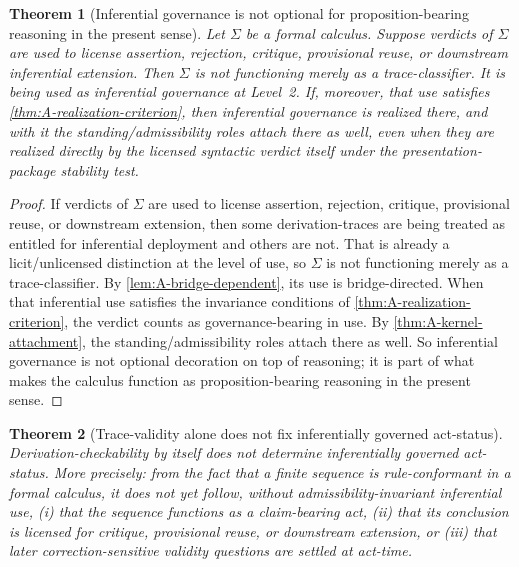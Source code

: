 \documentclass[11pt]{article}
\theoremstyle{plain}
\newtheorem{theorem}{Theorem}[section]
\theoremstyle{definition}
\begin{document}
\begin{theorem}[Inferential governance is not optional for proposition-bearing reasoning in the present sense]
\label{thm:A-inferential-uptake}
Let $\Sigma$ be a formal calculus. Suppose verdicts of $\Sigma$ are used to license assertion, rejection, critique, provisional reuse, or downstream inferential extension. Then $\Sigma$ is not functioning merely as a trace-classifier. It is being used as inferential governance at Level~2. If, moreover, that use satisfies \cref{thm:A-realization-criterion}, then inferential governance is realized there, and with it the standing/admissibility roles attach there as well, even when they are realized directly by the licensed syntactic verdict itself under the presentation-package stability test.
\end{theorem}

\begin{proof}
If verdicts of $\Sigma$ are used to license assertion, rejection, critique, provisional reuse, or downstream extension, then some derivation-traces are being treated as entitled for inferential deployment and others are not. That is already a licit/unlicensed distinction at the level of use, so $\Sigma$ is not functioning merely as a trace-classifier. By \cref{lem:A-bridge-dependent}, its use is bridge-directed. When that inferential use satisfies the invariance conditions of \cref{thm:A-realization-criterion}, the verdict counts as governance-bearing in use. By \cref{thm:A-kernel-attachment}, the standing/admissibility roles attach there as well. So inferential governance is not optional decoration on top of reasoning; it is part of what makes the calculus function as proposition-bearing reasoning in the present sense.
\end{proof}

\begin{theorem}[Trace-validity alone does not fix inferentially governed act-status]
\label{thm:A-trace-not-enough}
Derivation-checkability by itself does not determine inferentially governed act-status. More precisely: from the fact that a finite sequence is rule-conformant in a formal calculus, it does not yet follow, without admissibility-invariant inferential use, (i) that the sequence functions as a claim-bearing act, (ii) that its conclusion is licensed for critique, provisional reuse, or downstream extension, or (iii) that later correction-sensitive validity questions are settled at act-time.
\end{theorem}
\end{document}
